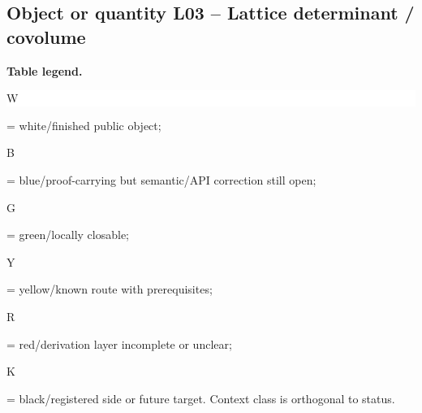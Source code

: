 \subsection*{Object or quantity L03 -- Lattice determinant /\allowbreak{} covolume}
\hypertarget{objproof:L03}{}
\par\smallskip\noindent\begin{minipage}{0.99\linewidth}\footnotesize\raggedright\textbf{Table legend.} \colorbox{white}{\strut W} = white/finished public object; \colorbox{cyan!20}{\strut B} = blue/proof-carrying but semantic/API correction still open; \colorbox{green!18}{\strut G} = green/locally closable; \colorbox{yellow!25}{\strut Y} = yellow/known route with prerequisites; \colorbox{red!20}{\strut R} = red/derivation layer incomplete or unclear; \colorbox{black!18}{\strut K} = black/registered side or future target. Context class is orthogonal to status.\end{minipage}\par\vspace{0.25em}
